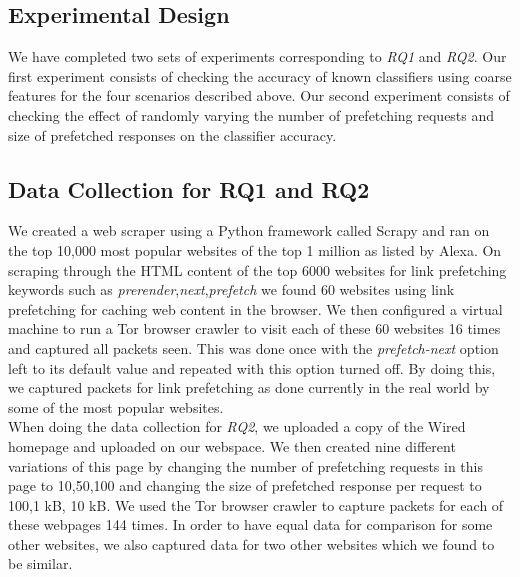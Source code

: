 \subsection{Experimental Design}
We have completed two sets of experiments corresponding to \emph{RQ1} and
\emph{RQ2}. Our first experiment consists of checking the accuracy of
known classifiers using coarse features for the four scenarios described
above. Our second experiment consists of checking the effect of randomly
varying the number of prefetching requests and size of prefetched
responses on the classifier accuracy.

\subsection{Data Collection for RQ1 and RQ2}
We created a web scraper using a Python framework called
Scrapy\cite{scrapy} and ran on the top 10,000 most popular websites of
the top 1 million as
listed by Alexa\cite{alexa-top}. On scraping through the HTML content of
the top 6000 websites for link prefetching keywords such as
\textit{prerender},\textit{next},\textit{prefetch} we found 60 websites
using link prefetching for caching web content in the browser. We then
configured a virtual machine to run a Tor browser crawler\cite{tor-browser-crawler} to visit each
of these 60 websites 16 times and captured all packets seen. This was
done once with the \textit{prefetch-next} option left to its default
value and repeated with this option turned off. By doing this, we
captured packets for link prefetching as done currently in the real
world by some of the most popular websites. \\
When doing the data collection for \emph{RQ2}, we uploaded a copy of
the Wired homepage\cite{wired} and uploaded on our
webspace\cite{tj-wired}. We then created nine different variations of
this page by changing the number of prefetching requests in this page to
10,50,100 and changing the size of prefetched response per request to
100,1 kB, 10 kB. We used the Tor browser
crawler\cite{tor-browser-crawler} to capture packets for each of these
webpages 144 times. In order to have equal data for comparison for some
other websites, we also captured data for two other websites which we
found to be similar.


